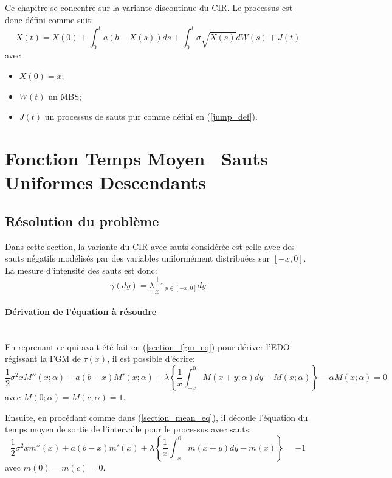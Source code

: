 \label{sec:FPT_Jump}
Ce chapitre se concentre sur la variante discontinue du \acs{CIR}. Le processus est donc défini comme suit:
\begin{equation}\label{jump_cir_sde}
    X(t)=X(0)+\int_0^t a(b-X(s))ds+\int_0^t\sigma\sqrt{X(s)}dW(s)+J(t)
\end{equation}
avec
\begin{itemize}
    \item $X(0)=x$;
    \item $W(t)$ un \acs{MBS};
    \item $J(t)$ un processus de sauts pur comme défini en (\ref{jump_def}).
\end{itemize}

\section{Fonction Temps Moyen \textemdash~Sauts Uniformes Descendants}\label{subsection_mean_jumps}
\subsection{Résolution du problème}
Dans cette section, la variante du \ac{CIR} avec sauts considérée est celle avec des sauts négatifs modélisés par des variables uniformément distribuées sur $[-x,0]$. La mesure d'intensité des sauts est donc:
\[
\gamma(dy)=\lambda\frac{1}{x}\mathds{1}_{y\in[-x,0]}dy
\]

\paragraph{Dérivation de l'équation à résoudre}\phantom{}\\
En reprenant ce qui avait été fait en (\ref{section_fgm_eq}) pour dériver l'\acs{EDO} régissant la \acl{FGM} de $\tau(x)$, il est possible d'écrire:
\[
\frac{1}{2}\sigma^2 xM''(x;\alpha)+a(b-x)M'(x;\alpha)+\lambda\left\{\frac{1}{x}\int_{-x}^0M(x+y;\alpha)dy-M(x;\alpha)\right\}-\alpha M(x;\alpha)=0
\]
avec $M(0;\alpha)=M(c;\alpha)=1$.

Ensuite, en procédant comme dans (\ref{section_mean_eq}), il découle l'équation du temps moyen de sortie de l'intervalle pour le processus avec sauts:
\begin{equation}\label{mean_ide}
    \frac{1}{2}\sigma^2 xm''(x)+a(b-x)m'(x)+\lambda\left\{\frac{1}{x}\int_{-x}^0m(x+y)dy-m(x)\right\}=-1
\end{equation}
avec $m(0)=m(c)=0$.

